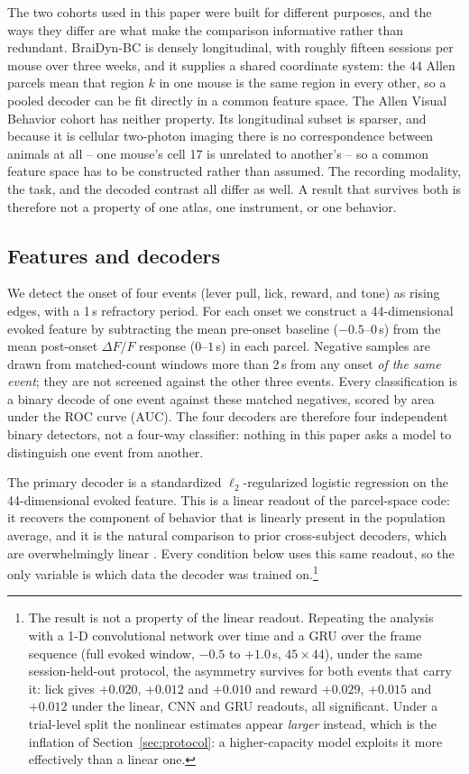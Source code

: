 \documentclass{article}
\newcommand{\auc}{\mathrm{AUC}}
\begin{document}
The two cohorts used in this paper were built for different purposes, and the ways they differ are
what make the comparison informative rather than redundant. BraiDyn-BC is densely longitudinal, with
roughly fifteen sessions per mouse over three weeks, and it supplies a shared coordinate system: the
44 Allen parcels mean that region $k$ in one mouse is the same region in every other, so a pooled
decoder can be fit directly in a common feature space. The Allen Visual Behavior cohort has neither
property. Its longitudinal subset is sparser, and because it is cellular two-photon imaging there is
no correspondence between animals at all -- one mouse's cell 17 is unrelated to another's -- so a
common feature space has to be constructed rather than assumed. The
recording modality, the task, and the decoded contrast all differ as well. A result that survives
both is therefore not a property of one atlas, one instrument, or one behavior.

\subsection{Features and decoders}
We detect the onset of four events (lever pull, lick, reward, and
tone) as rising edges, with a 1\,s refractory period. For each onset we construct a 44-dimensional
evoked feature by subtracting the mean pre-onset baseline ($-0.5$--$0$\,s) from the mean post-onset
$\Delta F/F$ response ($0$--$1$\,s) in each parcel. Negative samples are drawn from matched-count
windows more than 2\,s from any onset \emph{of the same event}; they are not screened against the
other three events. Every
classification is a binary decode of one event against these matched negatives, scored by area under
the ROC curve ($\auc$). The four decoders are therefore four independent binary detectors, not a
four-way classifier: nothing in this paper asks a model to distinguish one event from another.

The primary decoder is a standardized $\ell_2$-regularized logistic regression on
the 44-dimensional evoked feature. This is a linear readout of the parcel-space code: it recovers the
component of behavior that is linearly present in the population average, and it is the natural
comparison to prior cross-subject decoders, which are overwhelmingly linear
\citep{melbaum2022,peterson2021}. Every condition below uses this same readout, so the only variable
is which data the decoder was trained on.\footnote{The result is not a property of the linear
readout. Repeating the analysis with a 1-D convolutional network over time and a GRU over the frame
sequence (full evoked window, $-0.5$ to $+1.0$\,s, $45 \times 44$), under the same session-held-out
protocol, the asymmetry survives for both events that carry it: lick gives $+0.020$, $+0.012$ and
$+0.010$ and reward $+0.029$, $+0.015$ and $+0.012$ under the linear, CNN and GRU readouts, all
significant. Under a trial-level split the nonlinear estimates appear \emph{larger} instead, which is
the inflation of Section~\ref{sec:protocol}: a higher-capacity model exploits it more effectively
than a linear one.}
\end{document}
